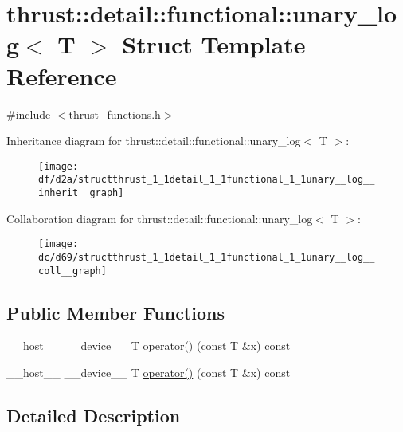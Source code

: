 \hypertarget{structthrust_1_1detail_1_1functional_1_1unary__log}{}\section{thrust\+:\+:detail\+:\+:functional\+:\+:unary\+\_\+log$<$ T $>$ Struct Template Reference}
\label{structthrust_1_1detail_1_1functional_1_1unary__log}


{\ttfamily \#include $<$thrust\+\_\+functions.\+h$>$}



Inheritance diagram for thrust\+:\+:detail\+:\+:functional\+:\+:unary\+\_\+log$<$ T $>$\+:
\nopagebreak
\begin{figure}[H]
\begin{center}
\leavevmode
\texttt{[image: df/d2a/structthrust\_1\_1detail\_1\_1functional\_1\_1unary\_\_log\_\_inherit\_\_graph]}
\end{center}
\end{figure}


Collaboration diagram for thrust\+:\+:detail\+:\+:functional\+:\+:unary\+\_\+log$<$ T $>$\+:
\nopagebreak
\begin{figure}[H]
\begin{center}
\leavevmode
\texttt{[image: dc/d69/structthrust\_1\_1detail\_1\_1functional\_1\_1unary\_\_log\_\_coll\_\_graph]}
\end{center}
\end{figure}
\subsection*{Public Member Functions}
\begin{DoxyCompactItemize}
\item 
\+\_\+\+\_\+host\+\_\+\+\_\+ \+\_\+\+\_\+device\+\_\+\+\_\+ T \hyperlink{structthrust_1_1detail_1_1functional_1_1unary__log_a5499b12773bc77939d402fe8f99ca8e5}{operator()} (const T \&x) const 
\item 
\+\_\+\+\_\+host\+\_\+\+\_\+ \+\_\+\+\_\+device\+\_\+\+\_\+ T \hyperlink{structthrust_1_1detail_1_1functional_1_1unary__log_a5499b12773bc77939d402fe8f99ca8e5}{operator()} (const T \&x) const 
\end{DoxyCompactItemize}


\subsection{Detailed Description}
